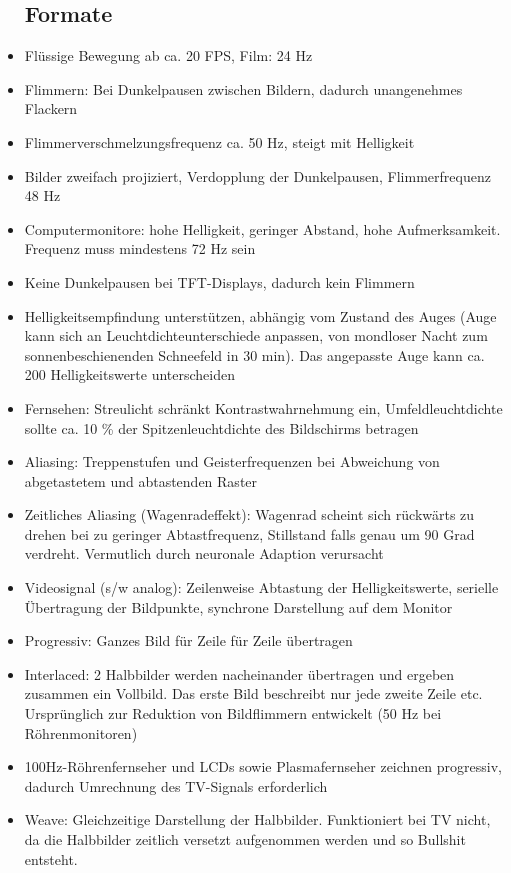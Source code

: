 \documentclass[12pt,landscape]{article}
\begin{document}
\begin{multicols}{3}
\begin{itemize}
\subsection{Formate}
\item Flüssige Bewegung ab ca. 20 FPS, Film: 24 Hz
\item Flimmern: Bei Dunkelpausen zwischen Bildern, dadurch unangenehmes Flackern
\item Flimmerverschmelzungsfrequenz ca. 50 Hz, steigt mit Helligkeit
\item Bilder zweifach projiziert, Verdopplung der Dunkelpausen, Flimmerfrequenz 48 Hz
\item Computermonitore: hohe Helligkeit, geringer Abstand, hohe Aufmerksamkeit. Frequenz muss mindestens 72 Hz sein
\item Keine Dunkelpausen bei TFT-Displays, dadurch kein Flimmern
\item Helligkeitsempfindung unterstützen, abhängig vom Zustand des Auges (Auge kann sich an Leuchtdichteunterschiede anpassen, von mondloser Nacht zum sonnenbeschienenden Schneefeld in 30 min). Das angepasste Auge kann ca. 200 Helligkeitswerte unterscheiden
\item Fernsehen: Streulicht schränkt Kontrastwahrnehmung ein, Umfeldleuchtdichte sollte ca. 10 \% der Spitzenleuchtdichte des Bildschirms betragen
\item Aliasing: Treppenstufen und Geisterfrequenzen bei Abweichung von abgetastetem und abtastenden Raster
\item Zeitliches Aliasing (Wagenradeffekt): Wagenrad scheint sich rückwärts zu drehen bei zu geringer Abtastfrequenz, Stillstand falls genau um 90 Grad  verdreht. Vermutlich durch neuronale Adaption verursacht
\item Videosignal (s/w analog): Zeilenweise Abtastung der Helligkeitswerte, serielle Übertragung der Bildpunkte, synchrone Darstellung auf dem Monitor
\item Progressiv: Ganzes Bild für Zeile für Zeile übertragen
\item Interlaced: 2 Halbbilder werden nacheinander übertragen und ergeben zusammen ein Vollbild. Das erste Bild beschreibt nur jede zweite Zeile etc. Ursprünglich zur Reduktion von Bildflimmern entwickelt (50 Hz bei Röhrenmonitoren)
\item 100Hz-Röhrenfernseher und LCDs sowie Plasmafernseher zeichnen progressiv, dadurch Umrechnung des TV-Signals erforderlich
\item Weave: Gleichzeitige Darstellung der Halbbilder. Funktioniert bei TV nicht, da die Halbbilder zeitlich versetzt aufgenommen werden und so Bullshit entsteht.

\end{itemize}
\end{multicols}
\end{document}
